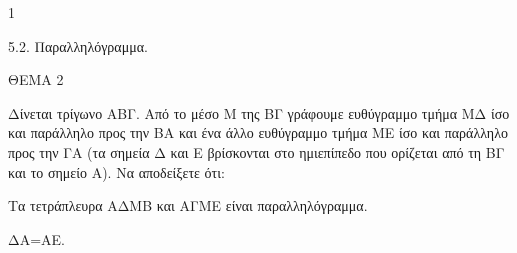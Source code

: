 \begin{ylh}{1}
    \item 5.2. Παραλληλόγραμμα.
\end{ylh}

ΘΕΜΑ 2

Δίνεται τρίγωνο ΑΒΓ. Από το μέσο Μ της ΒΓ γράφουμε ευθύγραμμο τμήμα ΜΔ ίσο και παράλληλο προς την ΒΑ και ένα άλλο ευθύγραμμο τμήμα ΜΕ ίσο και παράλληλο προς την ΓΑ (τα σημεία Δ και Ε βρίσκονται στο ημιεπίπεδο που ορίζεται από τη ΒΓ και το σημείο Α). Να αποδείξετε ότι:

\begin{alist}
\item Τα τετράπλευρα ΑΔΜΒ και ΑΓΜΕ είναι παραλληλόγραμμα. 

\item ΔΑ=ΑΕ. 
\end{alist}
